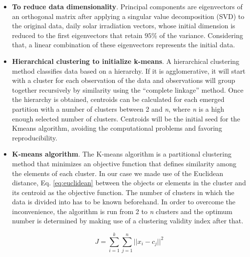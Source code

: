 \begin{itemize}
\item \textbf{To reduce data dimensionality}. Principal components are eigenvectors of an orthogonal matrix after applying a singular value decomposition (SVD) to the original data, daily solar irradiation vectors, whose initial dimension is reduced to the first eigenvectors that retain $95\%$ of the variance. Considering that, a linear combination of these eigenvectors represents the initial data.
\item \textbf{Hierarchical clustering to initialize k-means}. A hierarchical clustering method classifies data based on a hierarchy. If it is agglomerative, it will start with a cluster for each observation of the data and observations will group together recursively by similarity using the “complete linkage” method. Once the hierarchy is obtained, centroids can be calculated for each emerged partition with a number of clusters between 2 and \textit{n}, where \textit{n} is a high enough selected number of clusters. Centroids will be the initial seed for the Kmeans algorithm, avoiding the computational problems and favoring reproducibility.
\item \textbf{K-means algorithm}. The K-means algorithm is a partitional clustering method that minimizes an objective function that defines similarity among the elements of each cluster. In our case we made use of the Euclidean distance, Eq. \ref{eq:euclidean} between the objects or elements in the cluster and its centroid as the objective function. The number of clusters in which the data is divided into has to be known beforehand. In order to overcome the inconvenience, the algorithm is run from 2 to \textit{n} clusters and the optimum number is determined by making use of a clustering validity index after that.

\begin{equation}\label{eq:euclidean}
    J =\sum_{i=1}^{k}\sum_{j=1}^{n}{||x_i-c_j||}^2
\end{equation}




\end{itemize}
